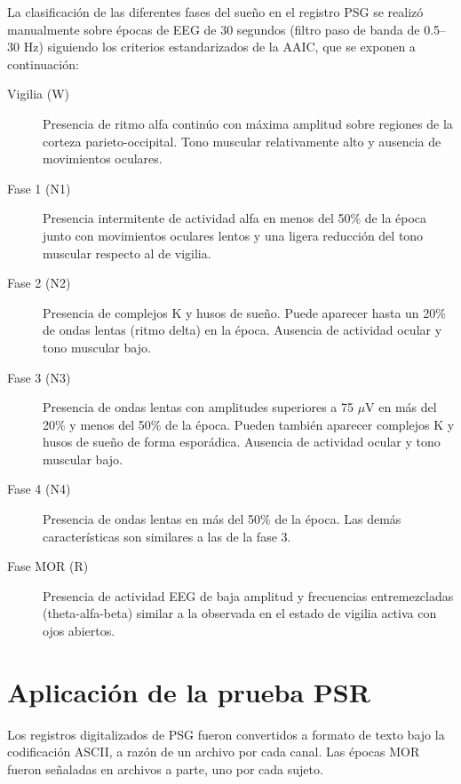 \documentclass[12pt,a4paper]{mitthesis}
\begin{document}
La clasificaci\'on de las diferentes fases del sue\~no en el registro PSG se realiz\'o manualmente 
sobre \'epocas de EEG de 30 segundos (filtro paso de banda de 0.5--30 Hz) siguiendo los criterios 
estandarizados de la AAIC\cite{Hori01}, que se exponen a continuación:
\begin{description}
\item[Vigilia (W)] Presencia de ritmo alfa contin\'uo con m\'axima amplitud sobre regiones de la 
corteza parieto-occipital. Tono muscular relativamente alto y ausencia de movimientos oculares.

\item[Fase 1 (N1)] Presencia intermitente de actividad alfa en menos del 50\% de la \'epoca junto 
con movimientos oculares lentos y una ligera reducci\'on del tono muscular respecto al de vigilia.

\item[Fase 2 (N2)] Presencia de complejos K y husos de sue\~no. Puede aparecer hasta un 20\% de 
ondas lentas (ritmo delta) en la \'epoca. Ausencia de actividad ocular y tono muscular bajo.

\item[Fase 3 (N3)] Presencia de ondas lentas con amplitudes superiores a 75 $\mu$V en m\'as del 
20\% y menos del 50\% de la \'epoca. Pueden tambi\'en aparecer complejos K y husos de sue\~no de 
forma espor\'adica. Ausencia de actividad ocular y tono muscular bajo.

\item[Fase 4 (N4)] Presencia de ondas lentas en m\'as del 50\% de la época. Las dem\'as 
caracter\'isticas son similares a las de la fase 3.

\item[Fase MOR (R)] Presencia de actividad EEG de baja amplitud y frecuencias entremezcladas 
(theta-alfa-beta) similar a la observada en el estado de vigilia activa con ojos abiertos.
\end{description}


\section{Aplicaci\'on de la prueba PSR}

Los registros digitalizados de PSG fueron convertidos a formato de texto bajo la codificaci\'on 
ASCII, a raz\'on de un archivo por cada canal. 
Las \'epocas MOR fueron se\~naladas en archivos a parte, uno por cada sujeto.
\end{document}
